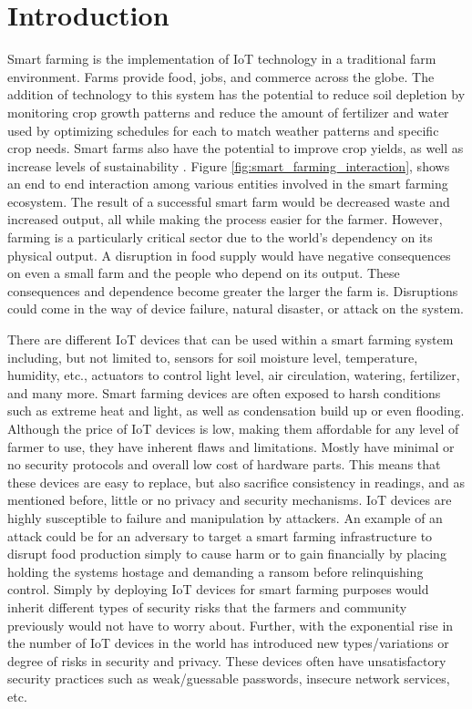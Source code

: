 \section{Introduction}
Smart farming is the implementation of IoT technology in a traditional farm environment. Farms provide food, jobs, and commerce across the globe. The addition of technology to this system has the potential to reduce soil depletion by monitoring crop growth patterns and reduce the amount of fertilizer and water used by optimizing schedules for each to match weather patterns and specific crop needs. Smart farms also have the potential to improve crop yields, as well as increase levels of sustainability \cite{iotfood}. Figure \ref{fig:smart_farming_interaction}, shows an end to end interaction among various entities involved in the smart farming ecosystem. The result of a successful smart farm would be decreased waste and increased output, all while making the process easier for the farmer. However, farming is a particularly critical sector due to the world's dependency on its physical output. A disruption in food supply would have negative consequences on even a small farm and the people who depend on its output. These consequences and dependence become greater the larger the farm is. Disruptions could come in the way of device failure, natural disaster, or attack on the system.  

There are different IoT devices that can be used within a smart farming system including, but not limited to, sensors for soil moisture level, temperature, humidity, etc., actuators to control light level, air circulation, watering, fertilizer, and many more. Smart farming devices are often exposed to harsh conditions such as extreme heat and light, as well as condensation build up or even flooding. Although the price of IoT devices is low, making them affordable for any level of farmer to use, they have inherent flaws and limitations. Mostly have minimal or no security protocols and overall low cost of hardware parts. This means that these devices are easy to replace, but also sacrifice consistency in readings, and as mentioned before, little or no privacy and security mechanisms. IoT devices are highly susceptible to failure and manipulation by attackers. An example of an attack could be for an adversary to target a smart farming infrastructure to disrupt food production simply to cause harm or to gain financially by placing holding the systems hostage and demanding a ransom before relinquishing control. Simply by deploying IoT devices for smart farming purposes would inherit different types of security risks that the farmers and community previously would not have to worry about. Further, with the exponential rise in the number of IoT devices in the world has introduced new types/variations or degree of risks in security and privacy. These devices often have unsatisfactory security practices such as weak/guessable passwords, insecure network services, etc. 

